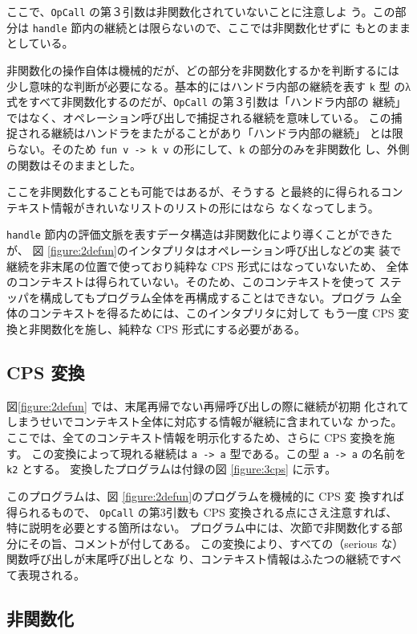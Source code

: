 ここで、\texttt{OpCall} の第３引数は非関数化されていないことに注意しよ
う。この部分は \texttt{handle} 節内の継続とは限らないので、ここでは非関数化せずに
もとのままとしている。

非関数化の操作自体は機械的だが、どの部分を非関数化するかを判断するには
少し意味的な判断が必要になる。基本的にはハンドラ内部の継続を表す \texttt{k} 型
のλ式をすべて非関数化するのだが、\texttt{OpCall} の第３引数は「ハンドラ内部の
継続」ではなく、オペレーション呼び出しで捕捉される継続を意味している。
この捕捉される継続はハンドラをまたがることがあり「ハンドラ内部の継続」
とは限らない。そのため \texttt{fun v -> k v} の形にして、\texttt{k} の部分のみを非関数化
し、外側の関数はそのままとした。

ここを非関数化することも可能ではあるが、そうする
と最終的に得られるコンテキスト情報がきれいなリストのリストの形にはなら
なくなってしまう。

\texttt{handle} 節内の評価文脈を表すデータ構造は非関数化により導くことができたが、
図 \ref{figure:2defun}のインタプリタはオペレーション呼び出しなどの実
装で継続を非末尾の位置で使っており純粋な CPS 形式にはなっていないため、
全体のコンテキストは得られていない。そのため、このコンテキストを使って
ステッパを構成してもプログラム全体を再構成することはできない。プログラ
ム全体のコンテキストを得るためには、このインタプリタに対して
もう一度 CPS 変換と非関数化を施し、純粋な CPS 形式にする必要がある。

\subsection{CPS 変換}
\label{subsection:3cps}

図\ref{figure:2defun} では、末尾再帰でない再帰呼び出しの際に継続が初期
化されてしまうせいでコンテキスト全体に対応する情報が継続に含まれていな
かった。
ここでは、全てのコンテキスト情報を明示化するため、さらに CPS 変換を施
す。
この変換によって現れる継続は \texttt{a -> a} 型である。この型
\texttt{a -> a} の名前を \texttt{k2} とする。
変換したプログラムは付録の図 \ref{figure:3cps} に示す。

このプログラムは、図 \ref{figure:2defun}のプログラムを機械的に CPS 変
換すれば得られるもので、
\texttt{OpCall} の第3引数も CPS 変換される点にさえ注意すれば、
特に説明を必要とする箇所はない。
プログラム中には、次節で非関数化する部分にその旨、コメントが付してある。
この変換により、すべての（serious な）関数呼び出しが末尾呼び出しとな
り、コンテキスト情報はふたつの継続ですべて表現される。

\subsection{非関数化}
\label{subsection:4defun}

